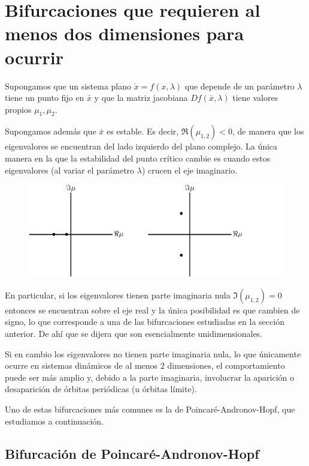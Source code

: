 \documentclass[11pt]{book}
\theoremstyle{definition}
\numberwithin{definition}{section}
\theoremstyle{theorem}
\numberwithin{theorem}{section}
\numberwithin{lemma}{section}
\numberwithin{corollary}{section}
\theoremstyle{plain}
\numberwithin{example}{section}
\begin{document}
\section{Bifurcaciones que requieren al menos dos dimensiones para ocurrir}

Supongamos que un sistema plano $\dot{x} = f(x, \lambda)$ que depende de un parámetro $\lambda$ tiene un punto fijo en $\bar{x}$ y que la matriz jacobiana $Df(\bar{x}, \lambda)$ tiene valores propios $\mu_1, \mu_2$.

Supongamos además que $\bar{x}$ es estable. Es decir, $\Re(\mu_{1,2}) < 0$, de manera que los eigenvalores se encuentran del lado izquierdo del plano complejo.
La única manera en la que la estabilidad del punto crítico cambie es cuando estos eigenvalores (al variar el parámetro $\lambda$) crucen el eje imaginario.

\begin{figure}[ht] \centering
    \includegraphics[scale=1.0]{figures/bifurcations-2dimensional.pdf}
\end{figure}

En particular, si los eigenvalores tienen parte imaginaria nula $\Im(\mu_{1,2}) = 0$ entonces se encuentran sobre el eje real y la única posibilidad es que cambien de signo, lo que corresponde a una de las bifurcaciones estudiadas en la sección anterior.
De ahí que se dijera que son esencialmente unidimensionales.

Si en cambio los eigenvalores no tienen parte imaginaria nula, lo que únicamente ocurre en sistemas dinámicos de al menos 2 dimensiones, el comportamiento puede ser más amplio y, debido a la parte imaginaria, involucrar la aparición o desaparición de órbitas periódicas (u órbitas límite).

Uno de estas bifurcaciones más comunes es la de Poincaré-Andronov-Hopf, que estudiamos a continuación.

\subsection{Bifurcación de Poincaré-Andronov-Hopf}
\end{document}
